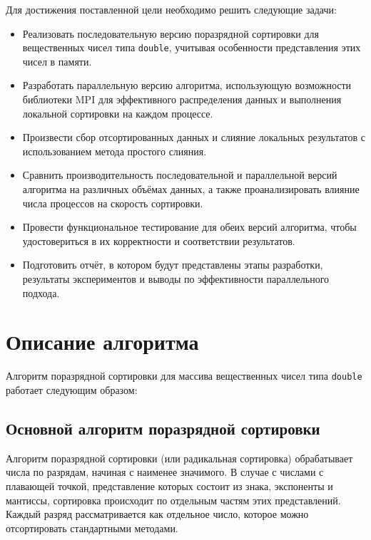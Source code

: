 \documentclass[12pt]{article}
\begin{document}
	Для достижения поставленной цели необходимо решить следующие задачи: \begin{itemize} 
		\item Реализовать последовательную версию поразрядной сортировки для вещественных чисел типа \texttt{double}, учитывая особенности представления этих чисел в памяти. 
		\item Разработать параллельную версию алгоритма, использующую возможности библиотеки MPI для эффективного распределения данных и выполнения локальной сортировки на каждом процессе. 
		\item Произвести сбор отсортированных данных и слияние локальных результатов с использованием метода простого слияния. 
		\item Сравнить производительность последовательной и параллельной версий алгоритма на различных объёмах данных, а также проанализировать влияние числа процессов на скорость сортировки. 
		\item Провести функциональное тестирование для обеих версий алгоритма, чтобы удостовериться в их корректности и соответствии результатов. 
		\item Подготовить отчёт, в котором будут представлены этапы разработки, результаты экспериментов и выводы по эффективности параллельного подхода. \end{itemize}
	
	\newpage
	
	\section*{Описание алгоритма} 
	
	\hspace*{1.25em}Алгоритм поразрядной сортировки для массива вещественных чисел типа \texttt{double} работает следующим образом:
	
	\subsection*{Основной алгоритм поразрядной сортировки} Алгоритм поразрядной сортировки (или радикальная сортировка) обрабатывает числа по разрядам, начиная с наименее значимого. В случае с числами с плавающей точкой, представление которых состоит из знака, экспоненты и мантиссы, сортировка происходит по отдельным частям этих представлений. Каждый разряд рассматривается как отдельное число, которое можно отсортировать стандартными методами.
	
\end{document}
